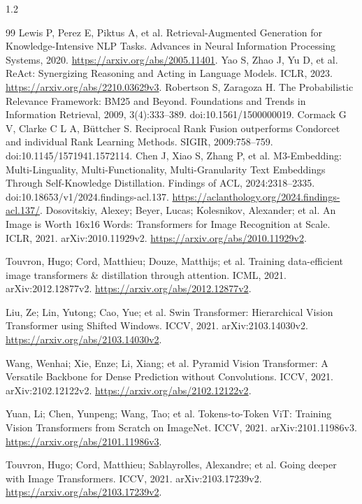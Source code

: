 \documentclass[UTF8,a4paper,zihao=-4,fontset=fandol]{ctexart}
\begin{document}
\begin{spacing}{1.2}\small
\begin{thebibliography}{99}
 Lewis P, Perez E, Piktus A, et al. Retrieval-Augmented Generation for Knowledge-Intensive NLP Tasks. Advances in Neural Information Processing Systems, 2020. \url{https://arxiv.org/abs/2005.11401}.
 Yao S, Zhao J, Yu D, et al. ReAct: Synergizing Reasoning and Acting in Language Models. ICLR, 2023. \url{https://arxiv.org/abs/2210.03629v3}.
 Robertson S, Zaragoza H. The Probabilistic Relevance Framework: BM25 and Beyond. Foundations and Trends in Information Retrieval, 2009, 3(4):333--389. doi:10.1561/1500000019.
 Cormack G V, Clarke C L A, Büttcher S. Reciprocal Rank Fusion outperforms Condorcet and individual Rank Learning Methods. SIGIR, 2009:758--759. doi:10.1145/1571941.1572114.
 Chen J, Xiao S, Zhang P, et al. M3-Embedding: Multi-Linguality, Multi-Functionality, Multi-Granularity Text Embeddings Through Self-Knowledge Distillation. Findings of ACL, 2024:2318--2335. doi:10.18653/v1/2024.findings-acl.137. \url{https://aclanthology.org/2024.findings-acl.137/}.
 Dosovitskiy, Alexey; Beyer, Lucas; Kolesnikov, Alexander; et al. An Image is Worth 16x16 Words: Transformers for Image Recognition at Scale. ICLR, 2021. arXiv:2010.11929v2. \url{https://arxiv.org/abs/2010.11929v2}.

 Touvron, Hugo; Cord, Matthieu; Douze, Matthijs; et al. Training data-efficient image transformers \& distillation through attention. ICML, 2021. arXiv:2012.12877v2. \url{https://arxiv.org/abs/2012.12877v2}.

 Liu, Ze; Lin, Yutong; Cao, Yue; et al. Swin Transformer: Hierarchical Vision Transformer using Shifted Windows. ICCV, 2021. arXiv:2103.14030v2. \url{https://arxiv.org/abs/2103.14030v2}.

 Wang, Wenhai; Xie, Enze; Li, Xiang; et al. Pyramid Vision Transformer: A Versatile Backbone for Dense Prediction without Convolutions. ICCV, 2021. arXiv:2102.12122v2. \url{https://arxiv.org/abs/2102.12122v2}.

 Yuan, Li; Chen, Yunpeng; Wang, Tao; et al. Tokens-to-Token ViT: Training Vision Transformers from Scratch on ImageNet. ICCV, 2021. arXiv:2101.11986v3. \url{https://arxiv.org/abs/2101.11986v3}.

 Touvron, Hugo; Cord, Matthieu; Sablayrolles, Alexandre; et al. Going deeper with Image Transformers. ICCV, 2021. arXiv:2103.17239v2. \url{https://arxiv.org/abs/2103.17239v2}.


\end{thebibliography}
\end{spacing}
\end{document}
